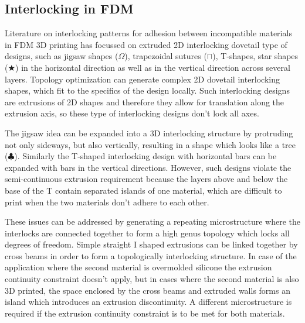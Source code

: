 \subsection{Interlocking in FDM}

Literature on interlocking patterns for adhesion between incompatible materials in FDM 3D printing has focussed on extruded 2D interlocking dovetail type of designs,
such as jigsaw shapes ($\Omega$)\cite{malik2017}, trapezoidal sutures ($\sqcap$)\cite{Li2013}, T-shapes\cite{Ribeiro2019,mustafa2021development}, star shapes ($\bigstar$)\cite{Wang2021} in the horizontal direction
as well as in the vertical direction across several layers\cite{debora2020}.
Topology optimization can generate complex 2D dovetail interlocking shapes, which fit to the specifics of the design locally\cite{aharoni2021}.
Such interlocking designs are extrusions of 2D shapes and therefore they allow for translation along the extrusion axis, so these type of interlocking designs don't lock all axes.

The jigsaw idea can be expanded into a 3D interlocking structure by protruding not only sideways, but also vertically, resulting in a shape which looks like a tree ($\clubsuit$)\cite{gouker2006manufacturing}.
Similarly the T-shaped interlocking design with horizontal bars can be expanded with bars in the vertical directions.
However, such designs violate the semi-continuous extrusion requirement because the layers above and below the base of the T contain separated islands of one material, 
which are difficult to print when the two materials don't adhere to each other.

These issues can be addressed by generating a repeating microstructure where the interlocks are connected together to form a high genus topology which locks all degrees of freedom.
Simple straight I shaped extrusions can be linked together by cross beams in order to form a topologically interlocking structure\cite{Rossing2020}.
In case of the application where the second material is overmolded silicone the extrusion continuity constraint doesn't apply,
but in cases where the second material is also 3D printed, the space enclosed by the cross beams and extruded walls forms an island which introduces an extrusion discontinuity.
A different microstructure is required if the extrusion continuity constraint is to be met for both materials.



